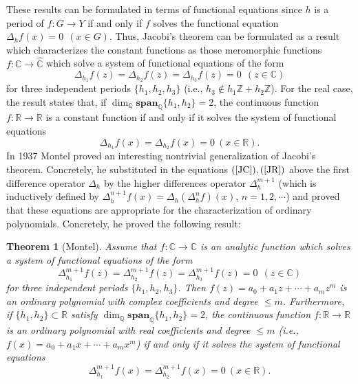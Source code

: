 \documentclass[12pt,a4paper]{amsart}
\newtheorem{theorem}{Theorem}[section]
\theoremstyle{definition}
\begin{document}
These results can be formulated in terms of functional equations since $h$ is a period of $f:G\to Y$ if and only if $f$ solves the functional equation
$\Delta_hf(x)=0 \ \ (x\in G).$ Thus, Jacobi's theorem can be formulated as a result which characterizes the constant functions as those meromorphic  functions $f:\mathbb{C}\to\widehat{\mathbb{C}}$  which solve a system of functional equations of the form 
\begin{equation}\label{JC}
\Delta_{h_1}f(z)=\Delta_{h_2}f(z)=\Delta_{h_3}f(z)=0 \ \ (z\in \mathbb{C})
\end{equation}
for three independent periods $\{h_1,h_2,h_3\}$ (i.e., $h_3\not\in h_1\mathbb{Z}+h_2\mathbb{Z}$). For the real case, the result states that, if $\dim_{\mathbb{Q}}\mathbf{span}_{\mathbb{Q}}\{h_1,h_2\}=2$, the continuous function $f:\mathbb{R}\to\mathbb{R}$ is a constant function if and only if it solves the system of functional equations 
\begin{equation} \label{JR}
\Delta_{h_1}f(x)=\Delta_{h_2}f(x)= 0\ (x\in \mathbb{R}).
\end{equation}
In 1937  Montel \cite{montel} proved an interesting nontrivial generalization of Jacobi's theorem. Concretely, he substituted in the equations $(\ref{JC}),(\ref{JR})$ above the first difference operator $\Delta_h$ by  the higher differences operator $\Delta^{m+1}_h$ (which is inductively defined by $\Delta_h^{n+1}f(x)=\Delta_h(\Delta_h^nf)(x)$, $n=1,2,\cdots$) and proved that these equations are appropriate for the characterization of ordinary polynomials. Concretely, he proved the following result:
\begin{theorem}[Montel] Assume that $f:\mathbb{C}\to\mathbb{C}$ is an analytic function  which solves a system of functional equations of the form 
\begin{equation}\label{JC}
\Delta_{h_1}^{m+1}f(z)=\Delta_{h_2}^{m+1}f(z)=\Delta_{h_3}^{m+1}f(z)=0 \ \ (z\in \mathbb{C})
\end{equation}
for three independent periods $\{h_1,h_2,h_3\}$. Then $f(z)=a_0+a_1z+\cdots+a_mz^m$ is an ordinary polynomial with complex coefficients and degree $\leq m$. Furthermore, if $\{h_1,h_2\}\subset \mathbb{R}$ satisfy 
$\dim_{\mathbb{Q}}\mathbf{span}_{\mathbb{Q}}\{h_1,h_2\}=2$, the continuous function $f:\mathbb{R}\to\mathbb{R}$ is an ordinary polynomial with real coefficients and degree $\leq m$ (i.e., $f(x)=a_0+a_1x+\cdots+a_mx^m$) if and only if it solves the system of functional equations 
\begin{equation} \label{JR}
\Delta_{h_1}^{m+1}f(x)=\Delta_{h_2}^{m+1}f(x)= 0\ (x\in \mathbb{R}).
\end{equation}
\end{theorem}
\end{document}
